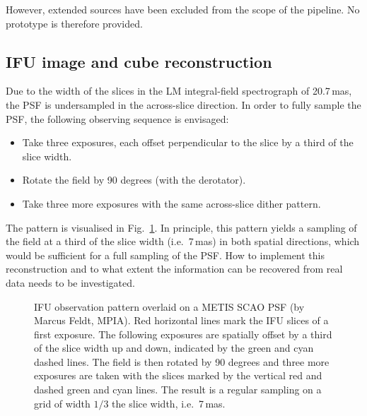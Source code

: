 However, extended sources have been excluded from the scope of the pipeline.
No prototype is therefore provided.


\subsection{IFU image and cube reconstruction}
\label{ssec:criticalifuimageandcubereconstruction}
\label{ssec:image_reconstruction}

Due to the width of the slices in the LM integral-field spectrograph
of 20.7\,mas, the PSF is undersampled in the across-slice direction.
In order to fully sample the PSF, the following observing sequence is envisaged:
\begin{itemize}
    \item Take three exposures, each offset perpendicular to the slice by a third of the slice width.
    \item Rotate the field by 90 degrees (with the derotator).
    \item Take three more exposures with the same across-slice dither pattern.
\end{itemize}

The pattern is visualised in Fig.~\ref{fig:ifu_pattern}. In principle,
this pattern yields a sampling of the field at a third of the slice
width (i.e.~7\,mas) in both spatial directions, which would be
sufficient for a full sampling of the PSF. How to implement this
reconstruction and to what extent the information can be recovered
from real data needs to be investigated.

\begin{figure}[hb]
  \centering
  \caption[IFU dithering and rotation pattern]{%
    IFU observation pattern overlaid on a METIS SCAO PSF (by Marcus
    Feldt, MPIA). Red horizontal lines mark the IFU slices of a first
    exposure. The following exposures are spatially offset by a third
    of the slice width up and down, indicated by the green and cyan
    dashed lines. The field is then rotated by 90 degrees and three
    more exposures are taken with the slices marked by the vertical
    red and dashed green and cyan lines. The result is a regular
    sampling on a grid of width $1/3$ the slice width, i.e.~7\,mas.}
  \label{fig:ifu_pattern}
\end{figure}


